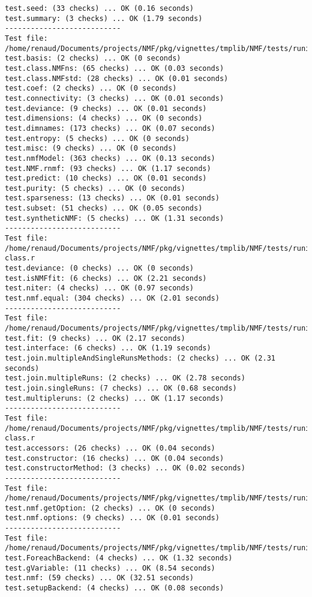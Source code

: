 \documentclass[10pt]{article}
\begin{document}
\begin{verbatim}
test.seed: (33 checks) ... OK (0.16 seconds)
test.summary: (3 checks) ... OK (1.79 seconds)
--------------------------- 
Test file: /home/renaud/Documents/projects/NMF/pkg/vignettes/tmplib/NMF/tests/runit.NMFclass.r 
test.basis: (2 checks) ... OK (0 seconds)
test.class.NMFns: (65 checks) ... OK (0.03 seconds)
test.class.NMFstd: (28 checks) ... OK (0.01 seconds)
test.coef: (2 checks) ... OK (0 seconds)
test.connectivity: (3 checks) ... OK (0.01 seconds)
test.deviance: (9 checks) ... OK (0.01 seconds)
test.dimensions: (4 checks) ... OK (0 seconds)
test.dimnames: (173 checks) ... OK (0.07 seconds)
test.entropy: (5 checks) ... OK (0 seconds)
test.misc: (9 checks) ... OK (0 seconds)
test.nmfModel: (363 checks) ... OK (0.13 seconds)
test.NMF.rnmf: (93 checks) ... OK (1.17 seconds)
test.predict: (10 checks) ... OK (0.01 seconds)
test.purity: (5 checks) ... OK (0 seconds)
test.sparseness: (13 checks) ... OK (0.01 seconds)
test.subset: (51 checks) ... OK (0.05 seconds)
test.syntheticNMF: (5 checks) ... OK (1.31 seconds)
--------------------------- 
Test file: /home/renaud/Documents/projects/NMF/pkg/vignettes/tmplib/NMF/tests/runit.NMFfit-class.r 
test.deviance: (0 checks) ... OK (0 seconds)
test.isNMFfit: (6 checks) ... OK (2.21 seconds)
test.niter: (4 checks) ... OK (0.97 seconds)
test.nmf.equal: (304 checks) ... OK (2.01 seconds)
--------------------------- 
Test file: /home/renaud/Documents/projects/NMF/pkg/vignettes/tmplib/NMF/tests/runit.NMFSet.r 
test.fit: (9 checks) ... OK (2.17 seconds)
test.interface: (6 checks) ... OK (1.19 seconds)
test.join.multipleAndSingleRunsMethods: (2 checks) ... OK (2.31 seconds)
test.join.multipleRuns: (2 checks) ... OK (2.78 seconds)
test.join.singleRuns: (7 checks) ... OK (0.68 seconds)
test.multipleruns: (2 checks) ... OK (1.17 seconds)
--------------------------- 
Test file: /home/renaud/Documents/projects/NMF/pkg/vignettes/tmplib/NMF/tests/runit.NMFStrategy-class.r 
test.accessors: (26 checks) ... OK (0.04 seconds)
test.constructor: (16 checks) ... OK (0.04 seconds)
test.constructorMethod: (3 checks) ... OK (0.02 seconds)
--------------------------- 
Test file: /home/renaud/Documents/projects/NMF/pkg/vignettes/tmplib/NMF/tests/runit.options.r 
test.nmf.getOption: (2 checks) ... OK (0 seconds)
test.nmf.options: (9 checks) ... OK (0.01 seconds)
--------------------------- 
Test file: /home/renaud/Documents/projects/NMF/pkg/vignettes/tmplib/NMF/tests/runit.parallel.r 
test.ForeachBackend: (4 checks) ... OK (1.32 seconds)
test.gVariable: (11 checks) ... OK (8.54 seconds)
test.nmf: (59 checks) ... OK (32.51 seconds)
test.setupBackend: (4 checks) ... OK (0.08 seconds)

\end{verbatim}
\end{document}
